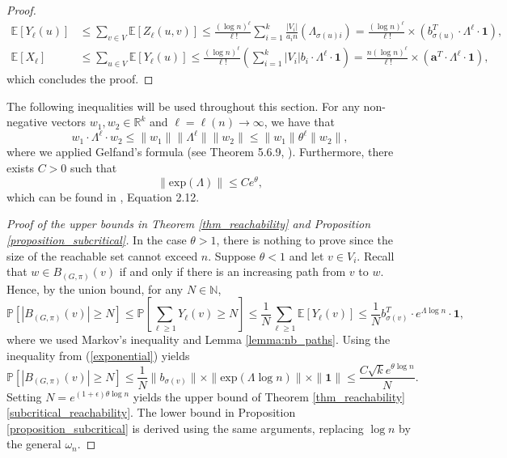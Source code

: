 \documentclass[11pt]{article}
\numberwithin{equation}{section}
\theoremstyle{definition}
\newcommand\bE{{\mathbb E}}
\newcommand\bN{{\mathbb N}}
\newcommand\bP{{\mathbb P}}
\begin{document}
\begin{proof}
\begin{equation*}
    \begin{split}
        \bE[Y_\ell(u)] &\leq \sum_{v\in V} \bE[Z_\ell(u,v)] \leq \frac{(\log n)^\ell}{\ell!}\sum_{i=1}^k \frac{|V_i|}{a_i n} (\Lambda_{\sigma(u)i}) = \frac{(\log n)^\ell }{\ell!} \times (b_{\sigma(u)}^T \cdot \Lambda^\ell \cdot \boldsymbol{1}) , \\
        \bE[X_\ell] &\leq \sum_{u \in V}\bE[Y_{\ell}(u)] \leq \frac{(\log n)^\ell}{\ell!} \left(\sum_{i=1}^k |V_i|b_i \cdot \Lambda^\ell \cdot \boldsymbol{1} \right)  = \frac{n (\log n)^\ell }{\ell!} \times (\boldsymbol{a}^T \cdot \Lambda^\ell \cdot \boldsymbol{1}),
    \end{split}
\end{equation*}
which concludes the proof.
\end{proof}

The following inequalities will be used throughout this section. For any non-negative vectors $w_1,w_2 \in \mathbb{R}^k$ and $\ell = \ell(n) \to \infty$, we have that
\begin{equation}
\label{gelfands}
w_1 \cdot \Lambda^\ell \cdot w_2 \leq \|w_1 \| \|\Lambda^\ell \| \| w_2\| \leq \|w_1\| \theta^\ell \|w_2\|,
\end{equation}
where we applied Gelfand's formula (see Theorem 5.6.9, \cite{HJ85}). Furthermore, there exists $C>0$ such that
\begin{equation}
\label{exponential}
\|\textrm{exp}(\Lambda)\| \leq C e^\theta, 
\end{equation}
which can be found in \cite{J04}, Equation 2.12.

\begin{proof}[Proof of the upper bounds in Theorem \ref{thm_reachability} and Proposition \ref{proposition_subcritical}]
In the case $\theta > 1$, there is nothing to prove since the size of the reachable set cannot exceed $n$. Suppose $\theta < 1$ and let $v \in V_i$. Recall that $w \in B_{(G,\pi)}(v)$ if and only if there is an increasing path from $v$ to $w$. Hence, by the union bound, for any $N\in \bN$,
$$\bP[|B_{(G,\pi)}(v)| \geq N] \leq \bP\left[\sum_{\ell \geq 1} Y_\ell(v) \geq N\right] \leq \frac{1}{N}\sum_{\ell \geq 1} \bE[Y_\ell(v)] \leq \frac{1}{N} b^T_{\sigma(v)} \cdot e^{\Lambda\log n}\cdot \boldsymbol{1},$$
where we used Markov's inequality and Lemma \ref{lemma:nb_paths}. Using the inequality from (\ref{exponential}) yields%
$$\bP[|B_{(G,\pi)}(v)|\geq N] \leq \frac{1}{N}\|b_{\sigma(v)}\|\times \|\textrm{exp}(\Lambda \log n)\|\times\|\boldsymbol{1}\| \leq \frac{C\sqrt{k}e^{\theta \log n}}{N}. $$
Setting $N = e^{(1+\epsilon)\theta \log n}$ yields the upper bound of Theorem \ref{thm_reachability}\ref{subcritical_reachability}. The lower bound in Proposition \ref{proposition_subcritical} is derived using the same arguments, replacing $\log n$ by the general $\omega_n$. \end{proof}
\end{document}
